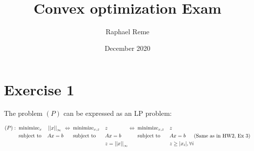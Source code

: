 \documentclass{article}
\title{Convex optimization Exam}
\author{Raphael Reme}
\date{December 2020}
\begin{document}
\maketitle
\section{Exercise 1}

The problem $(P)$ can be expressed as an LP problem:

\begin{equation*}
    \begin{aligned}
        (P):\;\; & \text{minimize}_x &  & \left|\left| x \right|\right|_\infty \\
                 & \text{subject to} &  & Ax = b          \\
                 &                   &  &                 \\
    \end{aligned}
    \;
    \begin{aligned}
        \Leftrightarrow\;\; & \text{minimize}_{x, z} &  & z                   \\
                            & \text{subject to}      &  & Ax = b              \\
                            &                        &  & z = \left|\left| x \right|\right|_\infty \\
    \end{aligned}
    \;
    \begin{aligned}
        \Leftrightarrow\;\; & \text{minimize}_{x, z} &  & z                      \\
                            & \text{subject to}      &  & Ax = b                 \\
                            &                        &  & z \ge |x_i|, \forall i \\
    \end{aligned}
    \text {(Same as in HW2, Ex 3)}
\end{equation*}
\vspace{10px}
\end{document}
